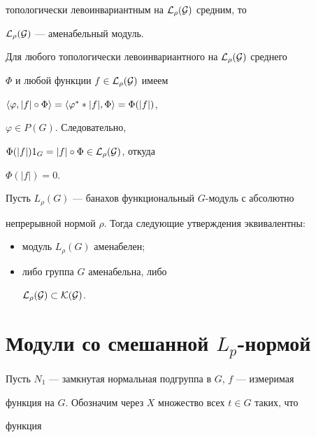 \begin{pf}
топологически левоинвариантным на $\cal L_\rho(G)$ средним, то


$\cal L_\rho(G)$ --- аменабельный модуль.





Для любого топологически левоинвариантного на $\cal L_\rho(G)$ среднего


$\Phi$ и любой функции $f\in\cal L_\rho(G)$ имеем


$\langle\varphi,|f|\circ\Phi\rangle=\langle\varphi^*\ast|f|,\Phi\rangle=\Phi(|f|)$,


$\varphi\in P(G)$. Следовательно,


$\Phi(|f|)1_G=|f|\circ\Phi\in\cal L_\rho(G)$, откуда


$\Phi(|f|)=0$.


\end{pf}





\begin{cors}


Пусть $L_\rho(G)$ --- банахов функциональный $G$-модуль с абсолютно


непрерывной нормой $\rho$. Тогда следующие утверждения эквивалентны:


\begin{itemize}


\item[1)] модуль $L_\rho(G)$ аменабелен;


\item[2)] либо группа $G$ аменабельна, либо


$\cal L_\rho(G)\subset\cal K(G)$.


\end{itemize}


\end{cors}





\section{Модули со смешанной $L_p$-нормой}





Пусть $N_1$ --- замкнутая нормальная подгруппа в $G$, $f$ --- измеримая


функция на $G$. Обозначим через $X$ множество всех $t\in G$ таких, что


функция


